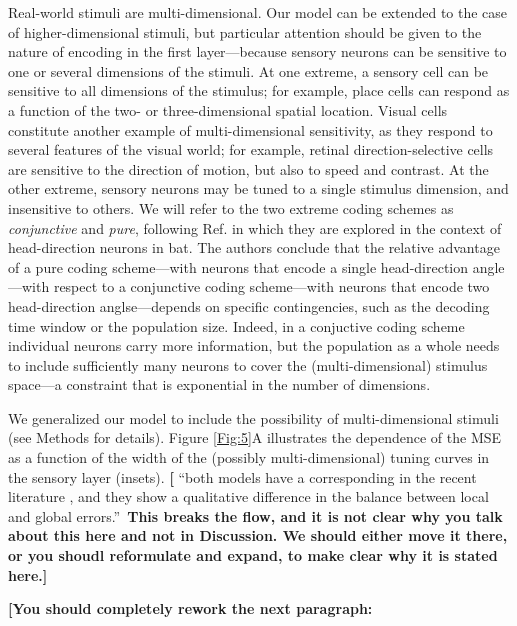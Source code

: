 \documentclass[a4paper]{article}%
\begin{document}
Real-world stimuli are multi-dimensional. Our model can be extended to the
case of higher-dimensional stimuli, but particular attention should be given
to the nature of encoding in the first layer---because sensory neurons can be
sensitive to one or several dimensions of the stimuli. At one extreme, a
sensory cell can be sensitive to all dimensions of the stimulus; for example,
place cells can respond as a function of the two- or three-dimensional spatial
location. Visual cells constitute another example of multi-dimensional
sensitivity, as they respond to several features of the visual world; for
example, retinal direction-selective cells are sensitive to the direction of
motion, but also to speed and contrast. At the other extreme, sensory neurons
may be tuned to a single stimulus dimension, and insensitive to others. We
will refer to the two extreme coding schemes as \textit{conjunctive} and
\textit{pure}, following Ref. \cite{Finkelstein2018OptimalBats} in which they
are explored in the context of head-direction neurons in bat. The authors
conclude that the relative advantage of a pure coding scheme---with neurons
that encode a single head-direction angle---with respect to a conjunctive
coding scheme---with neurons that encode two head-direction anglse---depends
on specific contingencies, such as the decoding time window or the population
size. Indeed, in a conjuctive coding scheme individual neurons carry more
information, but the population as a whole needs to include sufficiently many
neurons to cover the (multi-dimensional) stimulus space---a constraint that is
exponential in the number of dimensions.

We generalized our model to include the possibility of multi-dimensional
stimuli (see Methods for details). Figure \ref{Fig:5}A illustrates the
dependence of the MSE as a function of the width of the (possibly
multi-dimensional) tuning curves in the sensory layer (insets). \textbf{[}%
\textquotedblleft both models have a corresponding in the recent literature
\cite{Bouchacourt2019AMemory,Lalazar2016TuningConnectivity}, and they show a
qualitative difference in the balance between local and global
errors.\textquotedblright\ \textbf{This breaks the flow, and it is not clear
why you talk about this here and not in Discussion. We should either move it
there, or you shoudl reformulate and expand, to make clear why it is stated
here.]}

\bigskip

\textbf{[You should completely rework the next paragraph:}
\end{document}
